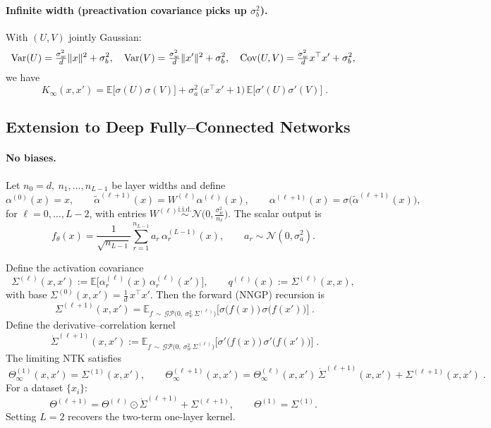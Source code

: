 \paragraph{Infinite width (preactivation covariance picks up $\sigma_b^2$).}

With $(U,V)$ jointly Gaussian:
\[
	\mathrm{Var}(U)=\tfrac{\sigma_w^2}{d}\|x\|^2+\sigma_b^2,\quad
	\mathrm{Var}(V)=\tfrac{\sigma_w^2}{d}\|x'\|^2+\sigma_b^2,\quad
	\mathrm{Cov}(U,V)=\tfrac{\sigma_w^2}{d}x^\top x'+\sigma_b^2,
\]
we have
\[
	\boxed{\;
		K_\infty(x,x')
		=\mathbb E\!\big[\sigma(U)\sigma(V)\big]
		+\sigma_a^2\,\big(x^\top x' + 1\big)\,\mathbb E\!\big[\sigma'(U)\sigma'(V)\big]\; }.
\]

\subsection{Extension to Deep Fully--Connected Networks}\label{subsec:deep-ntk}

\paragraph{No biases. }
Let $n_0=d,\ n_1,\ldots,n_{L-1}$ be layer widths and define
\[
	\alpha^{(0)}(x)=x,\qquad
	\tilde\alpha^{(\ell+1)}(x)=W^{(\ell)}\alpha^{(\ell)}(x),\qquad
	\alpha^{(\ell+1)}(x)=\sigma\!\big(\tilde\alpha^{(\ell+1)}(x)\big),
\]
for $\ell=0,\dots,L-2$, with entries $W^{(\ell)}\stackrel{\text{i.i.d.}}{\sim}\mathcal N\!\Big(0,\frac{\sigma_w^2}{n_\ell}\Big)$.
The scalar output is
\[
	f_\theta(x)=\frac{1}{\sqrt{n_{L-1}}}\sum_{r=1}^{n_{L-1}} a_r\,\alpha^{(L-1)}_r(x),\qquad a_r\sim\mathcal N(0,\sigma_a^2).
\]

\medskip\noindent
Define the activation covariance
\[
	\Sigma^{(\ell)}(x,x'):=\mathbb E\!\big[\alpha^{(\ell)}_r(x)\,\alpha^{(\ell)}_r(x')\big],\qquad
	q^{(\ell)}(x):=\Sigma^{(\ell)}(x,x),
\]
with base $\Sigma^{(0)}(x,x')=\tfrac{1}{d}\,x^\top x'$.
Then the forward (NNGP) recursion is
\[
	\boxed{\;
		\Sigma^{(\ell+1)}(x,x')
		=\mathbb E_{f\,\sim\,\mathcal{GP}\!\big(0,\ \sigma_w^2\,\Sigma^{(\ell)}\big)}\!
		\big[\sigma\!\big(f(x)\big)\,\sigma\!\big(f(x')\big)\big]\;}.
\]
Define the derivative–correlation kernel
\[
	\boxed{\;
		\dot\Sigma^{(\ell+1)}(x,x')
		:=\mathbb E_{f\,\sim\,\mathcal{GP}\!\big(0,\ \sigma_w^2\,\Sigma^{(\ell)}\big)}\!
		\big[\sigma'\!\big(f(x)\big)\,\sigma'\!\big(f(x')\big)\big]\; }.
\]
The limiting NTK satisfies
\[
	\boxed{\;
		\Theta_\infty^{(1)}(x,x')=\Sigma^{(1)}(x,x'),\qquad
		\Theta_\infty^{(\ell+1)}(x,x')
		=\Theta_\infty^{(\ell)}(x,x')\,\dot\Sigma^{(\ell+1)}(x,x')+\Sigma^{(\ell+1)}(x,x')\; }.
\]
For a dataset $\{x_i\}$:
\[
	\Theta^{(\ell+1)}=\Theta^{(\ell)}\odot \dot\Sigma^{(\ell+1)}+\Sigma^{(\ell+1)},\qquad
	\Theta^{(1)}=\Sigma^{(1)}.
\]
Setting $L=2$ recovers the two-term one-layer kernel.


